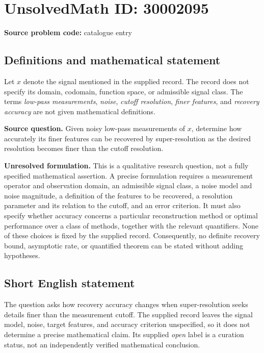 \documentclass[11pt]{article}
\begin{document}
\section*{UnsolvedMath ID: 30002095}
\textbf{Source problem code:} catalogue entry
\subsection{Definitions and mathematical statement}
Let \(x\) denote the signal mentioned in the supplied record. The record does not specify its domain, codomain, function space, or admissible signal class. The terms \emph{low-pass measurements}, \emph{noise}, \emph{cutoff resolution}, \emph{finer features}, and \emph{recovery accuracy} are not given mathematical definitions.

\textbf{Source question.} Given noisy low-pass measurements of \(x\), determine how accurately its finer features can be recovered by super-resolution as the desired resolution becomes finer than the cutoff resolution.

\textbf{Unresolved formulation.} This is a qualitative research question, not a fully specified mathematical assertion. A precise formulation requires a measurement operator and observation domain, an admissible signal class, a noise model and noise magnitude, a definition of the features to be recovered, a resolution parameter and its relation to the cutoff, and an error criterion. It must also specify whether accuracy concerns a particular reconstruction method or optimal performance over a class of methods, together with the relevant quantifiers. None of these choices is fixed by the supplied record. Consequently, no definite recovery bound, asymptotic rate, or quantified theorem can be stated without adding hypotheses.
\subsection{Short English statement}
The question asks how recovery accuracy changes when super-resolution seeks details finer than the measurement cutoff. The supplied record leaves the signal model, noise, target features, and accuracy criterion unspecified, so it does not determine a precise mathematical claim. Its supplied \emph{open} label is a curation status, not an independently verified mathematical conclusion.
\end{document}
